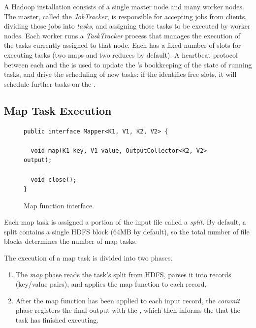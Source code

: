 A Hadoop installation consists of a single master node and many worker
nodes. The master, called the \emph{JobTracker}, is responsible for
accepting jobs from clients, dividing those jobs into \emph{tasks},
and assigning those tasks to be executed by worker nodes. Each worker
runs a \emph{TaskTracker} process that manages the execution of the
tasks currently assigned to that node. Each {\TT} has a fixed number
of slots for executing tasks (two maps and two reduces by
default). A heartbeat protocol between each {\TT} and the {\JT} is used
to update the {\JT}'s bookkeeping of the state of running tasks, and
drive the scheduling of new tasks: if the \JT identifies free {\TT}
slots, it will schedule further tasks on the {\TT}.

\subsection{Map Task Execution}
\label{ch:mrback:sec:maptask}

\begin{figure}[t]
\ssp
\begin{minipage}{\linewidth}
\centering
\begin{verbatim}
public interface Mapper<K1, V1, K2, V2> {
  
  void map(K1 key, V1 value, OutputCollector<K2, V2> output);

  void close();
}
\end{verbatim}
\end{minipage}
\caption{Map function interface.}
\label{fig:mapfunction}
\end{figure}

Each map task is assigned a portion of the input file called a \emph{split}. By
default, a split contains a single HDFS block (64MB by default), so the total
number of file blocks determines the number of map tasks.

The execution of a map task is divided into two phases.
\begin{enumerate}
\item
  The \emph{map} phase reads the task's split from HDFS, parses it into
  records (key/value pairs), and applies the map function to each
  record.
\item
  After the map function has been applied to each input record, the
  \emph{commit} phase registers the final output with the {\TT}, which
  then informs the {\JT} that the task has finished executing.
\end{enumerate}


